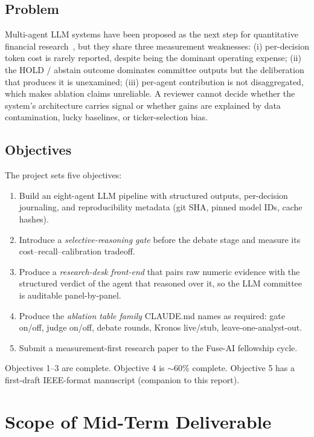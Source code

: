\documentclass[conference]{IEEEtran}
\begin{document}
\subsection{Problem}
Multi-agent LLM systems have been proposed as the next step for
quantitative financial research~\cite{tradingagents,finagent,finmem},
but they share three measurement weaknesses: (i) per-decision token
cost is rarely reported, despite being the dominant operating
expense; (ii) the HOLD / abstain outcome dominates committee outputs
but the deliberation that produces it is unexamined;
(iii) per-agent contribution is not disaggregated, which makes
ablation claims unreliable. A reviewer cannot decide whether the
system's architecture carries signal or whether gains are explained
by data contamination, lucky baselines, or ticker-selection bias.

\subsection{Objectives}
The project sets five objectives:

\begin{enumerate}
  \item Build an eight-agent LLM pipeline with structured outputs,
  per-decision journaling, and reproducibility metadata (git SHA,
  pinned model IDs, cache hashes).
  \item Introduce a \emph{selective-reasoning gate} before the
  debate stage and measure its cost--recall--calibration tradeoff.
  \item Produce a \emph{research-desk front-end} that pairs raw
  numeric evidence with the structured verdict of the agent that
  reasoned over it, so the LLM committee is auditable panel-by-panel.
  \item Produce the \emph{ablation table family} CLAUDE.md names as
  required: gate on/off, judge on/off, debate rounds, Kronos
  live/stub, leave-one-analyst-out.
  \item Submit a measurement-first research paper to the Fuse-AI
  fellowship cycle.
\end{enumerate}

Objectives 1--3 are complete. Objective 4 is $\sim$60\% complete.
Objective 5 has a first-draft IEEE-format manuscript (companion to
this report).

\section{Scope of Mid-Term Deliverable}
\end{document}
